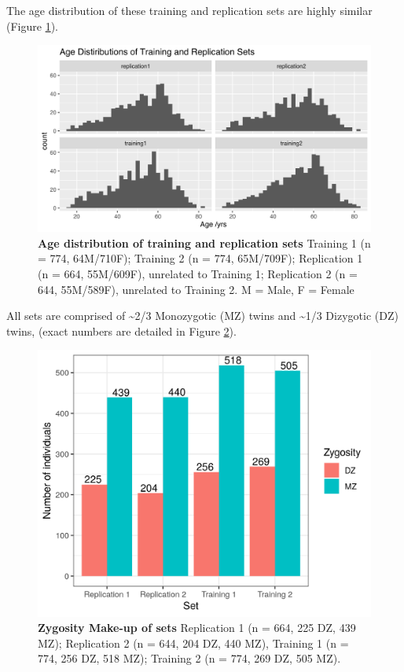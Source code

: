 \documentclass[
]{book}
\begin{document}
The age distribution of these training and replication sets are highly similar (Figure \ref{fig:setsAgeDist}).

\begin{figure}

{\centering \includegraphics[width=0.9\linewidth]{./figs/setsAgeDist} 

}

\caption{\textbf{Age distribution of training and replication sets} Training 1 (n = 774, 64M/710F); Training 2 (n = 774, 65M/709F); Replication 1 (n = 664, 55M/609F), unrelated to Training 1; Replication 2 (n = 644, 55M/589F), unrelated to Training 2. M = Male, F = Female}\label{fig:setsAgeDist}
\end{figure}



All sets are comprised of \textasciitilde2/3 Monozygotic (MZ) twins and \textasciitilde1/3 Dizygotic (DZ) twins, (exact numbers are detailed in Figure \ref{fig:mzdzsplitplot}).

\begin{figure}

{\centering \includegraphics[width=0.9\linewidth]{./figs/mzdzsplitplot} 

}

\caption{\textbf{Zygosity Make-up of sets} Replication 1 (n = 664, 225 DZ, 439 MZ); Replication 2 (n = 644, 204 DZ, 440 MZ), Training 1 (n = 774, 256 DZ, 518 MZ); Training 2 (n = 774, 269 DZ, 505 MZ).}\label{fig:mzdzsplitplot}
\end{figure}
\end{document}
